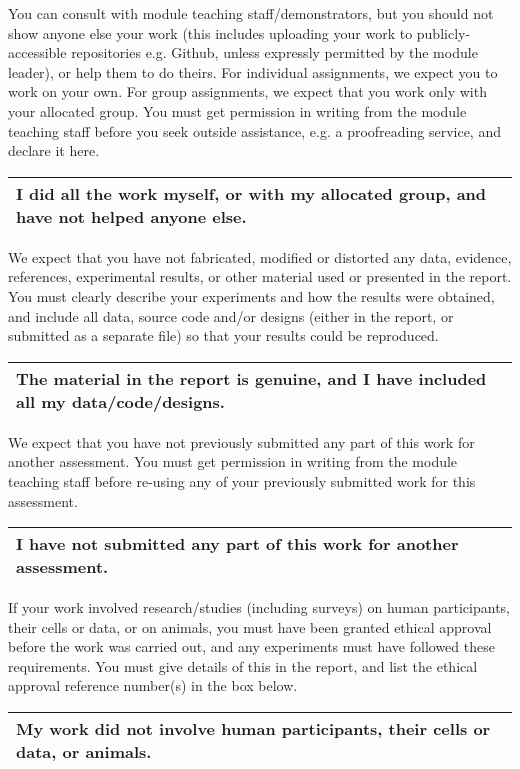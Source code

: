 \noindent You can consult with module teaching staff/demonstrators, but you should not show anyone else
your work (this includes uploading your work to publicly-accessible repositories e.g. Github, unless
expressly permitted by the module leader), or help them to do theirs. For individual assignments,
we expect you to work on your own. For group assignments, we expect that you work only with
your allocated group. You must get permission in writing from the module teaching staff before
you seek outside assistance, e.g. a proofreading service, and declare it here.

\begin{longtable}[ht]{ | p{\textwidth} | }
  \toprule
  \textbf{I did all the work myself, or with my allocated group, and have not helped anyone else.}
  \\\bottomrule
\end{longtable}

\noindent We expect that you have not fabricated, modified or distorted any data, evidence, references,
experimental results, or other material used or presented in the report. You must clearly describe
your experiments and how the results were obtained, and include all data, source code and/or
designs (either in the report, or submitted as a separate file) so that your results could be
reproduced. 
\vspace{4mm}
\begin{longtable}[ht]{ | p{\textwidth} | }
  \toprule
  \textbf{The material in the report is genuine, and I have included all my data/code/designs. }
  \\\bottomrule
\end{longtable}

\noindent We expect that you have not previously submitted any part of this work for another assessment.
You must get permission in writing from the module teaching staff before re-using any of your
previously submitted work for this assessment.

\begin{longtable}[ht]{ | p{\textwidth} | }
  \toprule
  \textbf{I have not submitted any part of this work for another assessment.}
  \\\bottomrule
\end{longtable}

\noindent If your work involved research/studies (including surveys) on human participants, their cells or
data, or on animals, you must have been granted ethical approval before the work was carried
out, and any experiments must have followed these requirements. You must give details of this in
the report, and list the ethical approval reference number(s) in the box below.

\begin{longtable}[ht]{ | p{\textwidth} | }
  \toprule
  \textbf{My work did not involve human participants, their cells or data, or animals.}
  \\\bottomrule
\end{longtable}